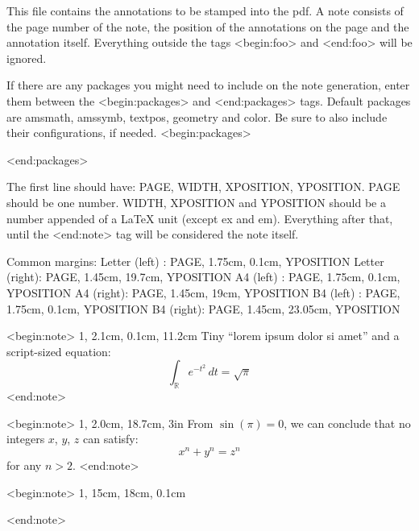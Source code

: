 This file contains the annotations to be stamped into the pdf.
A note consists of the page number of the note, the position of the
annotations on the page and the annotation itself.
Everything outside the tags <begin:foo> and <end:foo> will be ignored.


If there are any packages you might need to include on the note generation,
enter them between the <begin:packages> and <end:packages> tags.
Default packages are amsmath, amssymb, textpos, geometry and color.
Be sure to also include their configurations, if needed.
<begin:packages>
\usepackage{tikz}
<end:packages>


The first line should have: PAGE, WIDTH, XPOSITION, YPOSITION.
PAGE should be one number. WIDTH, XPOSITION and YPOSITION should be a number appended of a LaTeX unit (except ex and em). 
Everything after that, until the <end:note> tag will be considered the note itself.

Common margins:
Letter (left) : PAGE, 1.75cm, 0.1cm, YPOSITION
Letter (right): PAGE, 1.45cm, 19.7cm, YPOSITION
A4     (left) : PAGE, 1.75cm, 0.1cm, YPOSITION 
A4     (right): PAGE, 1.45cm, 19cm, YPOSITION 
B4     (left) : PAGE, 1.75cm, 0.1cm, YPOSITION 
B4     (right): PAGE, 1.45cm, 23.05cm, YPOSITION 

<begin:note>
1, 2.1cm, 0.1cm, 11.2cm
\tiny Tiny ``lorem ipsum dolor si amet'' and a script-sized equation: \\
\scriptsize
\[\int_{\mathbb{R}} e^{-t^2} \, dt = \sqrt{\pi}\]
<end:note>

<begin:note>
1, 2.0cm, 18.7cm, 3in
\scriptsize From $\sin(\pi) = 0$, we can conclude that no integers $x$, $y$, $z$
can satisfy: \[x^n + y^n = z^n\] for any $n > 2$.
<end:note>

<begin:note>
1, 15cm, 18cm, 0.1cm
<end:note>
